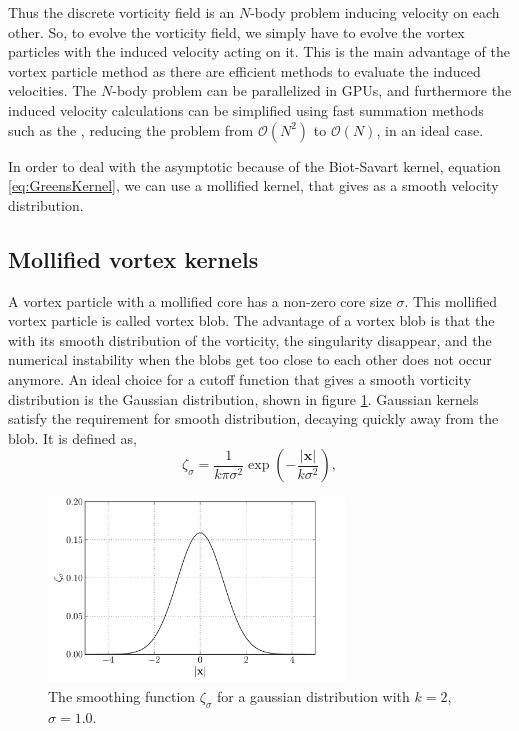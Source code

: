 Thus the discrete vorticity field is an $N$-body problem inducing velocity on each other. So, to evolve the vorticity field, we simply have to evolve the vortex particles with the induced velocity acting on it. This is the main advantage of the vortex particle method as there are efficient methods to evaluate the induced velocities. The $N$-body problem can be parallelized in GPUs, and furthermore the induced velocity calculations can be simplified using fast summation methods such as the , reducing the problem from $\mathcal{O}(N^2)$ to $\mathcal{O}(N)$, in an ideal case.

In order to deal with the asymptotic because of the Biot-Savart kernel, equation \ref{eq:GreensKernel}, we can use a mollified kernel, that gives as a smooth velocity distribution.

\subsection{Mollified vortex kernels}

A vortex particle with a mollified core has a non-zero core size $\sigma$. This mollified vortex particle is called vortex blob. The advantage of a vortex blob is that the with its smooth distribution of the vorticity, the singularity disappear, and the numerical instability when the blobs get too close to each other does not occur anymore. An ideal choice for a cutoff function that gives a smooth vorticity distribution is the Gaussian distribution, shown in figure \ref{fig:gaussianDistribution}. Gaussian kernels satisfy the requirement for smooth distribution, decaying quickly away from the blob. It is defined as,
	\begin{equation}
	\zeta_{\sigma} = \frac{1}{k\pi\sigma^2}\exp\left(-\frac{\left|\mathbf{x}\right|}{k\sigma^2}\right),
	\end{equation}
	
	\begin{figure}[t]
	\centering
	\includegraphics[width=0.7\textwidth]{figures/lagrangian/gaussianKernel.pdf}
	\caption{The smoothing function $\zeta_{\sigma}$ for a gaussian distribution with $k=2$, $\sigma=1.0$.}
	\label{fig:gaussianDistribution}
	\end{figure}


